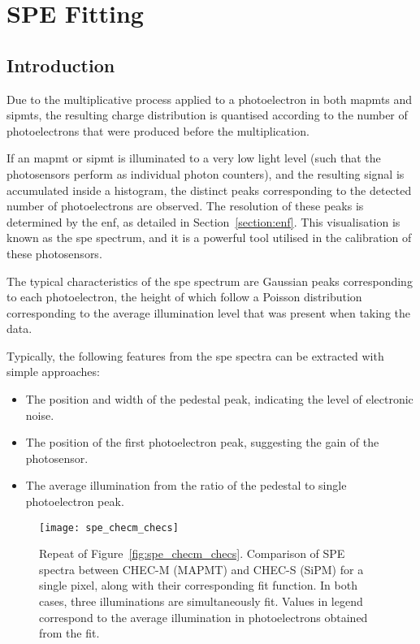 \chapter{\label{a3-spe}SPE Fitting}

\minitoc

\section{Introduction}

Due to the multiplicative process applied to a photoelectron in both \glspl{mapmt} and \glspl{sipmt}, the resulting charge distribution is quantised according to the number of photoelectrons that were produced before the multiplication. 

If an \gls{mapmt} or \gls{sipmt} is illuminated to a very low light level (such that the photosensors perform as individual photon counters), and the resulting signal is accumulated inside a histogram, the distinct peaks corresponding to the detected number of photoelectrons are observed. The resolution of these peaks is determined by the \gls{enf}, as detailed in Section~\ref{section:enf}. This visualisation is known as the \gls{spe} spectrum, and it is a powerful tool utilised in the calibration of these photosensors.

The typical characteristics of the \gls{spe} spectrum are Gaussian peaks corresponding to each photoelectron, the height of which follow a Poisson distribution corresponding to the average illumination level that was present when taking the data.

Typically, the following features from the \gls{spe} spectra can be extracted with simple approaches:
\begin{itemize}
\item The position and width of the pedestal peak, indicating the level of electronic noise.
\item The position of the first photoelectron peak, suggesting the gain of the photosensor.
\item The average illumination from the ratio of the pedestal to single photoelectron peak.
\end{itemize}

\begin{figure}
	\centering
    \texttt{[image: spe\_checm\_checs]} 
	\caption[(Repeated) Comparison of SPE spectra between CHEC-M and CHEC-S.]{Repeat of Figure~\ref{fig:spe_checm_checs}. Comparison of SPE spectra between CHEC-M (MAPMT) and CHEC-S (SiPM) for a single pixel, along with their corresponding fit function. In both cases, three illuminations are simultaneously fit. Values in legend correspond to the average illumination in photoelectrons obtained from the fit.} 
	\label{fig:spe_checm_checs_repeat}
\end{figure}

